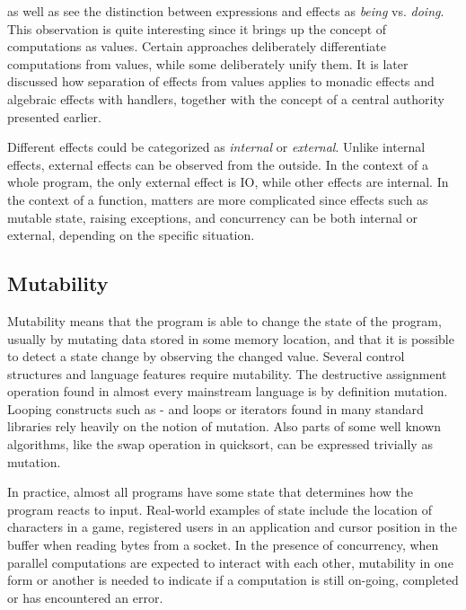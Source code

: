 \textcite{imperative-fp} as well as \textcite{do-be-do-be-do} see the distinction between expressions and effects as \textit{being} vs. \textit{doing}. This observation is quite interesting since it brings up the concept of computations as values. Certain approaches deliberately differentiate computations from values, while some deliberately unify them. It is later discussed how separation of effects from values applies to monadic effects and algebraic effects with handlers, together with the concept of a central authority presented earlier.

Different effects could be categorized as \textit{internal} or \textit{external}. Unlike internal effects, external effects can be observed from the outside. In the context of a whole program, the only external effect is IO, while other effects are internal. In the context of a function, matters are more complicated since effects such as mutable state, raising exceptions, and concurrency can be both internal or external, depending on the specific situation.


\subsection{Mutability} 
Mutability means that the program is able to change the state of the program, usually by mutating data stored in some memory location, and that it is possible to detect a state change by observing the changed value. Several control structures and language features require mutability. The destructive assignment operation found in almost every mainstream language is by definition mutation.~\cite[Chapter~3]{sicp} Looping constructs such as - and  loops or iterators found in many standard libraries rely heavily on the notion of mutation. Also parts of some well known algorithms, like the swap operation in quicksort, can be expressed trivially as mutation.

In practice, almost all programs have some state that determines how the program reacts to input. Real-world examples of state include the location of characters in a game, registered users in an application and cursor position in the buffer when reading bytes from a socket. In the presence of concurrency, when parallel computations are expected to interact with each other, mutability in one form or another is needed to indicate if a computation is still on-going, completed or has encountered an error.


